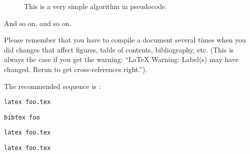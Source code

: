 \begin{figure}[htb]
\begin{center}
\end{center}
\caption{This is a very simple algorithm in pseudocode.}
\label{fig:source_algo1}
\end{figure}

\noindent
And so on, and so on.

Please remember that you have to compile a document several times when
you did changes that affect figures, table of contents, bibliography,
etc. (This is always the case if you get the warning: ``LaTeX Warning:
Label(s) may have changed. Rerun to get cross-references right.'').

The recommended sequence is :

\texttt{latex foo.tex}

\texttt{bibtex foo}

\texttt{latex foo.tex}

\texttt{latex foo.tex}
